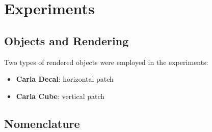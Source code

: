 \chapter{Experiments}
\label{experiments}

\section{Objects and Rendering}

Two types of rendered objects were employed in the experiments:
\begin{itemize}
    \item \textbf{Carla Decal}: horizontal patch
    \item \textbf{Carla Cube}: vertical patch
\end{itemize}


\section{Nomenclature}

